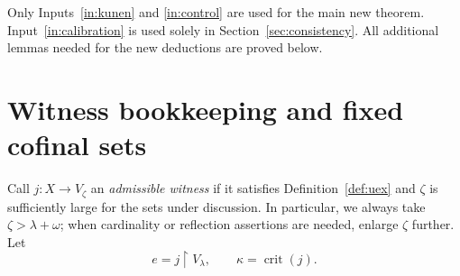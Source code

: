 \documentclass[11pt,letterpaper]{article}
\theoremstyle{definition}
\newcommand{\crit}{\operatorname{crit}}
\newcommand{\restr}{\mathbin{\upharpoonright}}
\numberwithin{equation}{section}
\begin{document}
Only Inputs~\ref{in:kunen} and \ref{in:control} are used for the main new theorem. Input~\ref{in:calibration} is used solely in Section~\ref{sec:consistency}. All additional lemmas needed for the new deductions are proved below.

\section{Witness bookkeeping and fixed cofinal sets}\label{sec:witness}

Call $j:X\to V_\zeta$ an \emph{admissible witness} if it satisfies Definition~\ref{def:uex} and $\zeta$ is sufficiently large for the sets under discussion. In particular, we always take $\zeta>\lambda+\omega$; when cardinality or reflection assertions are needed, enlarge $\zeta$ further. Let
\[
e=j\restr V_\lambda,\qquad\kappa=\crit(j).
\]
\end{document}
